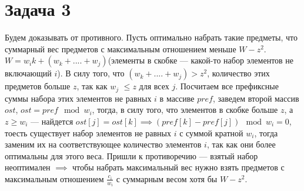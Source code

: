 \documentclass{article}
\begin{document}
\section{Задача 3}
Будем доказывать от противного. Пусть оптимально набрать такие предметы, что суммарный вес предметов с максимальным отношением меньше $W-z^2$. $W=w_{i}k+(w_{k}+....+w_j)$(элементы в скобке --- какой-то набор элементов не включающий $i$). В силу того, что $(w_{k}+....+w_j)>z^2$, количество этих предметов больше $ z$, так как $w_{j}$ $\leq z$ для всех $j$. Посчитаем все префиксные суммы набора этих элементов не равных $i$ в массиве $pref$, заведем второй массив $ost$, $ost = pref\mod w_{i}$, тогда, в силу того, что элементов в скобке больше $z$, а $z\geq w_{i}$ --- найдется $ost[j]=ost[k] \implies (pref[k]-pref[j])\mod w_{i}=0$, тоесть существует набор элементов не равных $i$ с суммой кратной $w_{i}$, тогда заменим их на соответствующее количество элементов $i$, так как они более оптимальны для этого веса. Пришли к противоречию --- взятый набор неоптимален $\implies$ чтобы набрать максимальный вес нужно взять предметов с максимальным отношением $\frac{c_{i}}{w_{i}}$ с суммарным весом хотя бы $W-z^2$.
\end{document}
